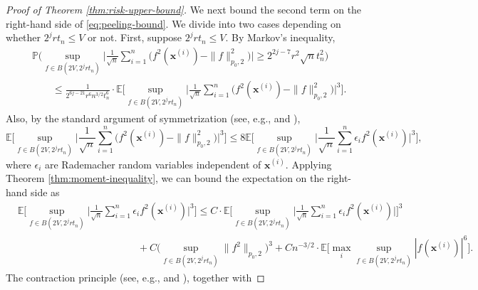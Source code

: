 \documentclass[10pt]{article}
\newcommand{\E}{{\mathbb E}}
\renewcommand{\P}{{\mathbb P}}
\newcommand{\xbf}{{\mathbf{x}}}
\begin{document}
\begin{proof}[Proof of Theorem \ref{thm:risk-upper-bound}]
We next bound the second term on the right-hand side of \eqref{eq:peeling-bound}.
We divide into two cases depending on whether $2^j r t_n \le V$ or not.
First, suppose $2^j r t_n \le V$.
By Markov's inequality, 
\begin{equation}\label{eq:markov-inequality-first-case-second-term}
\begin{aligned}
    &\P\Big(\sup_{f \in B(2V, 2^j r t_n)} 
    \Big|\frac{1}{\sqrt{n}} \sum_{i = 1}^{n} \big(f^2(\xbf^{(i)}) 
    -\|f\|_{p_0, 2}^2\big)\Big| \ge 2^{2j - 7} r^2 \sqrt{n}t_n^2 \Big) \\
    &\qquad \le \frac{1}{2^{6j - 21} r^6 n^{3/2} t_n^6} \cdot 
    \E\Big[\sup_{f \in B(2V, 2^j r t_n)} 
    \Big|\frac{1}{\sqrt{n}} \sum_{i = 1}^{n} \big(f^2(\xbf^{(i)}) 
    -\|f\|_{p_0, 2}^2\big) \Big|^3 \Big].
\end{aligned}
\end{equation}
Also, by the standard argument of symmetrization (see, e.g., 
\citet[Lemma 2.3.1]{vaartwellner96book} and 
\citet[Theorem 16.1]{van2016estimation}),
\begin{equation}\label{eq:symmetrization-first-case-second-term}
    \E\Big[\sup_{f \in B(2V, 2^j r t_n)} 
    \Big|\frac{1}{\sqrt{n}} \sum_{i = 1}^{n} \big(f^2(\xbf^{(i)}) 
    -\|f\|_{p_0, 2}^2\big) \Big|^3 \Big] 
    \le 8 \E\Big[\sup_{f \in B(2V, 2^j r t_n)} 
    \Big|\frac{1}{\sqrt{n}} \sum_{i = 1}^{n} \epsilon_i f^2(\xbf^{(i)}) 
    \Big|^3 \Big], 
\end{equation}
where $\epsilon_i$ are Rademacher random variables independent of 
$\xbf^{(i)}$.
Applying Theorem \ref{thm:moment-inequality}, we can bound the expectation on 
the right-hand side as
\begin{equation*}
\begin{aligned}
    &\E\Big[\sup_{f \in B(2V, 2^j r t_n)} 
    \Big|\frac{1}{\sqrt{n}} \sum_{i = 1}^{n} \epsilon_i f^2(\xbf^{(i)}) 
    \Big|^3 \Big] 
    \le C \cdot \E\Big[\sup_{f \in B(2V, 2^j r t_n)} 
    \Big|\frac{1}{\sqrt{n}} \sum_{i = 1}^{n} \epsilon_i f^2(\xbf^{(i)}) 
    \Big| \Big]^3 \\ 
    &\qquad \qquad \qquad \qquad \qquad \qquad
    + C \Big(\sup_{f \in B(2V, 2^j r t_n)} \|f^2\|_{p_0, 2}\Big)^3
    + Cn^{-3/2} \cdot \E \Big[\max_i \sup_{f \in B(2V, 2^j r t_n)} 
    |f(\xbf^{(i)})|^6\Big].
\end{aligned}
\end{equation*}
The contraction principle (see, e.g., 
\citet[Proposition A.3.2]{vaartwellner96book} and 
\citet[Theorem 4.12]{ledoux1991probability}), together with 

\end{proof}
\end{document}
